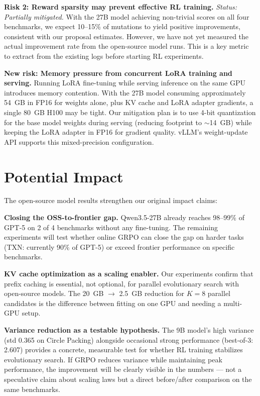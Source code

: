 \documentclass{article}
\begin{document}
\textbf{Risk 2: Reward sparsity may prevent effective RL training.} \emph{Status: Partially mitigated.} With the 27B model achieving non-trivial scores on all four benchmarks, we expect 10--15\% of mutations to yield positive improvements, consistent with our proposal estimates. However, we have not yet measured the actual improvement rate from the open-source model runs. This is a key metric to extract from the existing logs before starting RL experiments.

\textbf{New risk: Memory pressure from concurrent LoRA training and serving.} Running LoRA fine-tuning while serving inference on the same GPU introduces memory contention. With the 27B model consuming approximately 54~GB in FP16 for weights alone, plus KV cache and LoRA adapter gradients, a single 80~GB H100 may be tight. Our mitigation plan is to use 4-bit quantization for the base model weights during serving (reducing footprint to $\sim$14~GB) while keeping the LoRA adapter in FP16 for gradient quality. vLLM's weight-update API supports this mixed-precision configuration.

\section*{Potential Impact}

The open-source model results strengthen our original impact claims:

\textbf{Closing the OSS-to-frontier gap.} Qwen3.5-27B already reaches 98--99\% of GPT-5 on 2 of 4 benchmarks without any fine-tuning. The remaining experiments will test whether online GRPO can close the gap on harder tasks (TXN: currently 90\% of GPT-5) or exceed frontier performance on specific benchmarks.

\textbf{KV cache optimization as a scaling enabler.} Our experiments confirm that prefix caching is essential, not optional, for parallel evolutionary search with open-source models. The 20~GB $\rightarrow$ 2.5~GB reduction for $K=8$ parallel candidates is the difference between fitting on one GPU and needing a multi-GPU setup.

\textbf{Variance reduction as a testable hypothesis.} The 9B model's high variance (std 0.365 on Circle Packing) alongside occasional strong performance (best-of-3: 2.607) provides a concrete, measurable test for whether RL training stabilizes evolutionary search. If GRPO reduces variance while maintaining peak performance, the improvement will be clearly visible in the numbers --- not a speculative claim about scaling laws but a direct before/after comparison on the same benchmarks.
\end{document}
